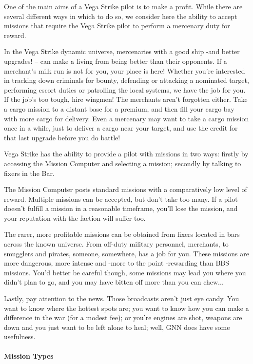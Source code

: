 \documentclass{article}
\begin{document}
One of the main aims of a Vega Strike pilot is to make a profit. While there are several different ways in which to do so, we consider here the ability to accept missions that require the Vega Strike pilot to perform a mercenary duty for reward. 

In the Vega Strike dynamic universe, mercenaries with a good ship -and better upgrades! -- can make a living from being better than their opponents. If a merchant's milk run is not for you, your place is here! Whether you're interested in tracking down criminals for bounty, defending or attacking a nominated target, performing escort duties or patrolling the local systems, we have the job for you. If the job's too tough, hire wingmen! The merchants aren't forgotten either. Take a cargo mission to a distant base for a premium, and then fill your cargo bay with more cargo for delivery. Even a mercenary may want to take a cargo mission once in a while, just to deliver a cargo near your target, and use the credit for that last upgrade before you do battle! 

Vega Strike has the ability to provide a pilot with missions in two ways: firstly by accessing the Mission Computer and selecting a mission; secondly by talking to fixers in the Bar. 

The Mission Computer posts standard missions with a comparatively low level of reward. Multiple missions can be accepted, but don't take too many. If a pilot doesn't fulfill a mission in a reasonable timeframe, you'll lose the mission, and your reputation with the faction will suffer too. 

The rarer, more profitable missions can be obtained from fixers located in bars across the known universe. From off-duty military personnel, merchants, to smugglers and pirates, someone, somewhere, has a job for you. These missions are more dangerous, more intense and -more to the point -rewarding than BBS missions. You'd better be careful though, some missions may lead you where you didn't plan to go, and you may have bitten off more than you can chew... 

Lastly, pay attention to the news. Those broadcasts aren't just eye candy. You want to know where the hottest spots are; you want to know how you can make a difference in the war (for a modest fee); or you're engines are shot, weapons are down and you just want to be left alone to heal; well, GNN does have some usefulness. 

\paragraph{Mission Types }
\end{document}
